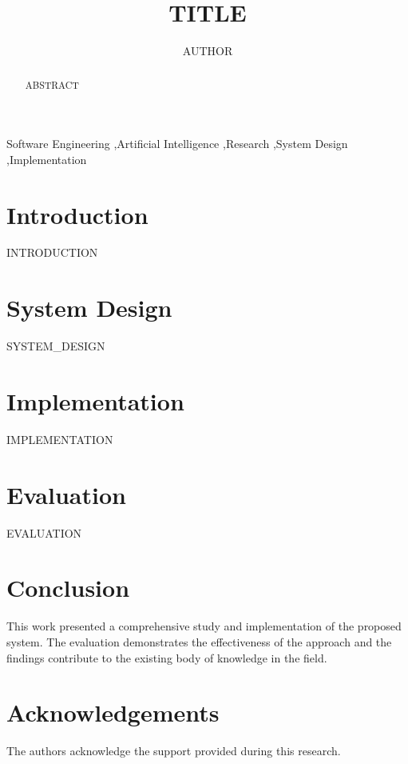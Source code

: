 \documentclass[preprint,12pt]{elsarticle}
\begin{document}
\begin{frontmatter}

\title{{{TITLE}}}

\author{{{AUTHOR}}}

\address{Department of Computer Science, University, City, Country}

\begin{abstract}
{{ABSTRACT}}
\end{abstract}

\begin{keyword}
Software Engineering \sep Artificial Intelligence \sep Research \sep System Design \sep Implementation
\end{keyword}

\end{frontmatter}

\linenumbers

\section{Introduction}
{{INTRODUCTION}}

\section{System Design}
{{SYSTEM_DESIGN}}

\section{Implementation}
{{IMPLEMENTATION}}

\section{Evaluation}
{{EVALUATION}}

\section{Conclusion}
This work presented a comprehensive study and implementation of the proposed system. The evaluation demonstrates the effectiveness of the approach and the findings contribute to the existing body of knowledge in the field.

\section*{Acknowledgements}
The authors acknowledge the support provided during this research.



\end{document}
